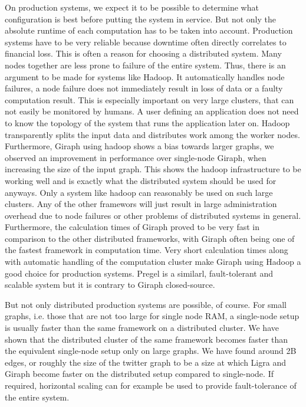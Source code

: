 On production systems, we expect it to be possible to determine what configuration is best before putting the system in service.
But not only the absolute runtime of each computation has to be taken into account. Production systems have to be very reliable because downtime often directly correlates to financial loss.
This is often a reason for choosing a distributed system. Many nodes together are less prone to failure of the entire system.
Thus, there is an argument to be made for systems like Hadoop.
It automatically handles node failures, a node failure does not immediately result in loss of data or a faulty computation result.
This is especially important on very large clusters, that can not easily be monitored by humans.
A user defining an application does not need to know the topology of the system that runs the application later on.
Hadoop transparently splits the input data and distributes work among the worker nodes.
Furthermore, Giraph using hadoop shows a bias towards larger graphs, we observed an improvement in performance over single-node Giraph, when increasing the size of the input graph.
This shows the hadoop infrastructure to be working well and is exactly what the distributed system should be used for anyways. 
Only a system like hadoop can reasonably be used on such large clusters.
Any of the other framewors will just result in large administration overhead due to node failures or other problems of distributed systems in general.
Furthermore, the calculation times of Giraph proved to be very fast in comparison to the other distributed frameworks, with Giraph often being one of the fastest framework in computation time.
Very short calculation times along with automatic handling of the computation cluster make Giraph using Hadoop a good choice for production systems.
Pregel is a similarl, fault-tolerant and scalable system but it is contrary to Giraph closed-source.

But not only distributed production systems are possible, of course. 
For small graphs, i.e. those that are not too large for single node RAM, a single-node setup is usually faster than the same framework on a distributed cluster. 
We have shown that the distributed cluster of the same framework becomes faster than the equivalent single-node setup only on large graphs.
We have found around 2B edges, or roughly the size of the twitter graph to be a size at which Ligra and Giraph become faster on the distributed setup compared to single-node.
If required, horizontal scaling can for example be used to provide fault-tolerance of the entire system.

